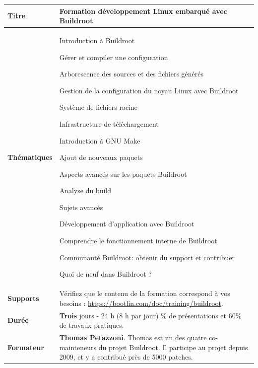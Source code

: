 \documentclass[a4paper,12pt,obeyspaces,spaces,hyphens]{article}
\begin{document}
\setlength{\arrayrulewidth}{0.8pt}

\feshowtitle

\small
{}

 {
  \begin{tabularx}{\textwidth}{|g|h|}
    {\bf Titre} & {\bf Formation développement Linux embarqué avec Buildroot} \\
    \hline

    {\bf Thématiques} &
    Introduction à Buildroot \par
    Gérer et compiler une configuration \par
    Arborescence des sources et des fichiers générés \par
    Gestion de la configuration du noyau Linux avec Buildroot \par
    Système de fichiers racine \par
    Infrastructure de téléchargement \par
    Introduction à GNU Make \par
    Ajout de nouveaux paquets \par
    Aspects avancés sur les paquets Buildroot \par
    Analyse du build \par
    Sujets avancés \par
    Développement d’application avec Buildroot \par
    Comprendre le fonctionnement interne de Buildroot \par
    Communauté Buildroot: obtenir du support et contribuer \par
    Quoi de neuf dans Buildroot ? \\
    \hline
    {\bf Supports} &
    Vérifiez que le contenu de la formation correspond à vos besoins :
    \newline \url{https://bootlin.com/doc/training/buildroot}. \\
    \hline

    {\bf Durée} & {\bf Trois} jours - 24 h (8 h par jour)
    \% de présentations et 60\% de travaux pratiques. \\
    \hline

    {\bf Formateur} & {\bf Thomas Petazzoni}. Thomas est un des quatre
    co-mainteneurs du projet Buildroot. Il participe au projet depuis
    2009, et y a contribué près de 5000 patches.\\
    \hline


\end{tabularx}}
\end{document}
